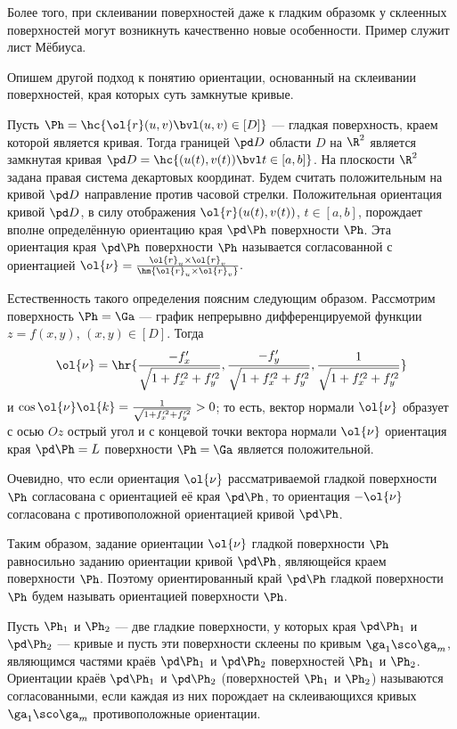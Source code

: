 \documentclass[a4paper]{article}
\begin{document}
Более того, при склеивании поверхностей даже к гладким образомк
у склеенных поверхностей могут возникнуть качественно новые
особенности. Пример служит лист Мёбиуса.

Опишем другой подход к понятию ориентации, основанный на склеивании
поверхностей, края которых суть замкнутые кривые.

Пусть $\Ph=\hc{\ol{r}(u,v)\bvl (u,v)\in[D]}$ --- гладкая
поверхность, краем которой является кривая. Тогда границей $\pd D$
области $D$ на $\R^2$ является замкнутая кривая $\pd
D=\hc{(u(t),v(t))\bvl t\in[a,b]}$. На плоскости $\R^2$ задана правая
система декартовых координат. Будем считать положительным на кривой
$\pd D$ направление против часовой стрелки. Положительная ориентация
кривой $\pd D$, в силу отображения $\ol{r}(u(t),v(t))$, $t\in[a,b]$,
порождает вполне определённую ориентацию края $\pd \Ph$ поверхности
$\Ph$. Эта ориентация края $\pd \Ph$ поверхности $\Ph$ называется
согласованной с ориентацией
$\ol{\nu}=\frac{\ol{r}_u\times\ol{r}_v}{\hm{\ol{r}_u\times\ol{r}_v}}.$

Естественность такого определения поясним следующим образом.
Рассмотрим поверхность $\Ph=\Ga$ --- график непрерывно
дифференцируемой функции $z=f(x,y)$, $(x,y)\in[D]$. Тогда $$\ol{\nu}
= \hr{\frac{-f'_x}{\sqrt{1+f'^2_x+f'^2_y}},
\frac{-f'_y}{\sqrt{1+f'^2_x+f'^2_y}},
\frac1{\sqrt{1+f'^2_x+f'^2_y}}}$$ и $\cos\ol{\nu}\ol{k} =
\frac1{\sqrt{1+f'^2_x+f'^2_y}}>0$; то есть, вектор нормали
$\ol{\nu}$ образует с осью $Oz$ острый угол и с концевой точки
вектора нормали $\ol{\nu}$ ориентация края $\pd\Ph=L$ поверхности
$\Ph=\Ga$ является положительной.

Очевидно, что если ориентация $\ol{\nu}$ рассматриваемой гладкой
поверхности $\Ph$ согласована с ориентацией её края $\pd\Ph$, то
ориентация $-\ol{\nu}$ согласована с противоположной ориентацией
кривой $\pd\Ph$.

Таким образом, задание ориентации $\ol{\nu}$ гладкой поверхности
$\Ph$ равносильно заданию ориентации кривой $\pd\Ph$, являющейся
краем поверхности $\Ph$. Поэтому ориентированный край $\pd\Ph$
гладкой поверхности $\Ph$ будем называть ориентацией поверхности
$\Ph$.

Пусть $\Ph_1$ и $\Ph_2$ --- две гладкие поверхности, у которых края
$\pd\Ph_1$ и $\pd\Ph_2$ --- кривые и пусть эти поверхности склеены
по кривым $\ga_1\sco\ga_m$, являющимся частями краёв $\pd\Ph_1$ и
$\pd\Ph_2$ поверхностей $\Ph_1$ и $\Ph_2$. Ориентации краёв $\pd
\Ph_1$ и $\pd\Ph_2$ (поверхностей $\Ph_1$ и $\Ph_2$) называются
согласованными, если каждая из них порождает на склеивающихся кривых
$\ga_1\sco\ga_m$ противоположные ориентации.
\end{document}
